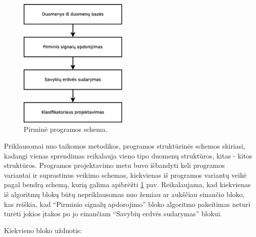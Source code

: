 \documentclass[]{vgtuef}
\begin{document}
\begin{figure}[!b]
  \centering
  \includegraphics[width=200px]{figures/pirmine_schema.eps}
  \caption{Pirminė programos schema.}
  \label{fig:pirmine_programos_schema}
\end{figure}

Priklausomai nuo taikomos metodikos, programos struktūrinės schemos skiriasi, kadangi vienas sprendimas reikalauja vieno tipo duomenų struktūros, kitas - kitos struktūros. Programos projektavimo metu buvo išbandyti keli programos variantai ir suprastinus veikimo schemas, kiekvienas iš programos variantų veikė pagal bendrą schemą, kurią galima apibrėžti \ref{fig:pirmine_programos_schema} pav. Reikalaujama, kad kiekvienas iš algoritmų blokų būtų nepriklausomas nuo žemiau ar aukščiau einančio bloko, kas reiškia, kad ``Pirminio signalų apdorojimo'' bloko algoritmo pakeitimas neturi turėti jokios įtakos po jo einančiam ``Savybių erdvės sudarymas'' blokui. 

Kiekvieno bloko užduotis:
\end{document}
